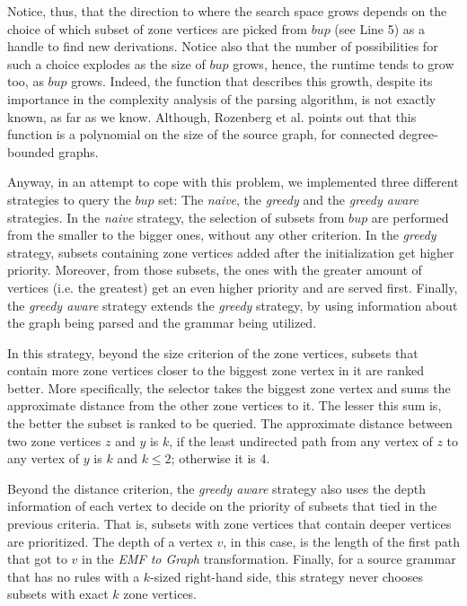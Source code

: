 Notice, thus, that the direction to where the search space grows depends on the choice of which subset of zone vertices are picked from $bup$ (see Line 5) as a handle to find new derivations. Notice also that the number of possibilities for such a choice explodes as the size of $bup$ grows, hence, the runtime tends to grow too, as $bup$ grows. Indeed, the function that describes this growth, despite its importance in the complexity analysis of the parsing algorithm, is not exactly known, as far as we know. Although, Rozenberg et al. \cite[p. 160]{rozenberg1986boundary} points out that this function is a polynomial on the size of the source graph, for connected degree-bounded graphs.

Anyway, in an attempt to cope with this problem, we implemented three different strategies to query the $bup$ set: The \emph{naive}, the \emph{greedy} and the \emph{greedy aware} strategies. In the \emph{naive} strategy, the selection of subsets from $bup$ are performed from the smaller to the bigger ones, without any other criterion. In the \emph{greedy} strategy, subsets containing zone vertices added after the initialization get higher priority. Moreover, from those subsets, the ones with the greater amount of vertices (i.e. the greatest) get an even higher priority and are served first. Finally, the \emph{greedy aware} strategy extends the \emph{greedy} strategy, by using information about the graph being parsed and the grammar being utilized.

In this strategy, beyond the size criterion of the zone vertices, subsets that contain more zone vertices closer to the biggest zone vertex in it are ranked better. More specifically, the selector takes the biggest zone vertex and sums the approximate distance from the other zone vertices to it. The lesser this sum is, the better the subset is ranked to be queried. The approximate distance between two zone vertices $z$ and $y$ is $k$, if the least undirected path from any vertex of $z$ to any vertex of $y$ is $k$ and $k \leq 2$; otherwise it is 4.

Beyond the distance criterion, the \emph{greedy aware} strategy also uses the depth information of each vertex to decide on the priority of subsets that tied in the previous criteria. That is, subsets with zone vertices that contain deeper vertices are prioritized. The depth of a vertex $v$, in this case, is the length of the first path that got to $v$ in the \emph{EMF to Graph} transformation. Finally, for a source grammar that has no rules with a $k$-sized right-hand side, this strategy never chooses subsets with exact $k$ zone vertices.


